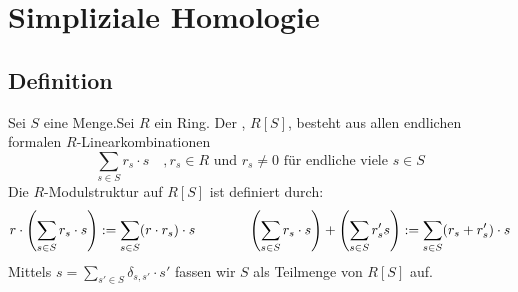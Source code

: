 \section{Simpliziale Homologie} %
\label{sec:3}

\subsection[Definition: Freier $R$-Modul mit Basis $S$]{Definition} %
\label{sub:31}
Sei $S$ eine Menge.Sei $R$ ein Ring. Der , $R[S]$, besteht aus allen endlichen formalen $R$-Linearkombinationen
\[
	\sum_{s \in S} r_s \cdot s \quad , r_s \in R \text{ und } r_s \not=0 \text{ für endliche viele }s \in S
\]
Die $R$-Modulstruktur auf $R[S]$ ist definiert durch:
\begin{align*}
	r \cdot \enbrace*{\sum_{s\in S} r_s \cdot s} := \sum_{s \in S} (r \cdot r_s) \cdot s \qquad \qquad 
	\enbrace*{\sum_{s \in S} r_s \cdot s} + \enbrace*{\sum_{s \in S} r_s' s} := \sum_{s \in S} (r_s + r_s') \cdot s
\end{align*}
Mittels $s= \sum_{s' \in S} \delta_{s,s'} \cdot s'$ fassen wir $S$ als Teilmenge von $R[S]$ auf.

